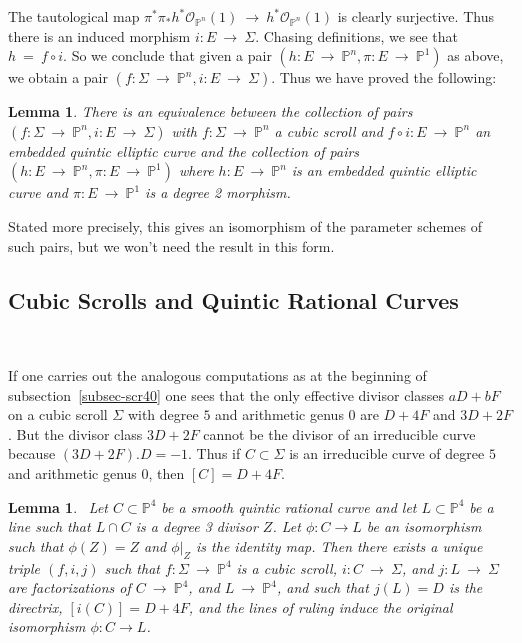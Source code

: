 \documentclass[twoside,12pt,reqno]{amsart}
\theoremstyle{plain}
\newtheorem{lem}[thm]{Lemma}
\theoremstyle{definition}
\newcommand{\PP}{\mathbb{P}}
\def\ps{\vspace{4pt}}
\newcommand{\OO}{\mathcal O}
\begin{document}
\ps

The tautological map $\pi^*\pi_* h^*\OO_{\PP^n}(1)~\rightarrow~
h^*\OO_{\PP^n}(1)$ is clearly surjective.  Thus there is an induced
morphism $i:E~\rightarrow~ \Sigma$.  Chasing definitions, we see that
$h~=~f\circ i$.  So we conclude that given a pair $(h:E~\rightarrow~
\PP^n, \pi:E~\rightarrow~ \PP^1)$ as above, we obtain a pair
$(f:\Sigma~\rightarrow~ \PP^n, i:E~\rightarrow~ \Sigma)$.  Thus we
have proved the following:

\begin{lem}\label{lem-equiv1}
There is an equivalence between the collection of pairs
$(f:\Sigma~\rightarrow~ \PP^n, i:E~\rightarrow~ \Sigma)$ with
$f:\Sigma~\rightarrow~ \PP^n$ a cubic scroll and $f\circ i:E~\rightarrow~
\PP^n$ an embedded quintic elliptic curve and the collection of pairs
$(h:E~\rightarrow~ \PP^n, \pi:E~\rightarrow~ \PP^1)$ where $h:E~\rightarrow~
\PP^n$ is an embedded quintic elliptic curve and $\pi:E~\rightarrow~
\PP^1$ is a degree 2 morphism.  
\end{lem}

Stated more precisely, this gives an
isomorphism of the parameter schemes of such pairs, but we won't need
the result in this form.

\ps

\subsection{Cubic Scrolls and Quintic Rational
Curves}~\label{subsec-scr50}

\ps

If one carries out the analogous computations as at the beginning of
subsection~\ref{subsec-scr40} one sees that the only effective divisor
classes $aD+bF$ on a cubic scroll $\Sigma$ with degree $5$ and
arithmetic genus $0$ are $D+4F$ and $3D+2F$.  But the divisor class
$3D+2F$ cannot be the divisor of an irreducible curve because
$(3D+2F).D = -1$.  Thus if $C\subset \Sigma$ is an irreducible curve
of degree $5$ and arithmetic genus $0$, then $[C]=D+4F$.  

\ps

\begin{lem}~\label{lem-scr50}
Let $C\subset \PP^4$ be a smooth quintic rational curve
and let $L\subset \PP^4$ be a line such that $L\cap C$ is a degree 3
divisor $Z$.  Let $\phi:C\rightarrow L$ be an isomorphism such that
$\phi(Z)=Z$ and $\phi|_Z$ is the identity map.  Then there exists a
unique triple $(f,i,j)$ such that $f:\Sigma~\rightarrow~\PP^4$ is a
cubic scroll, $i:C~\rightarrow~\Sigma$, and $j:L~\rightarrow~\Sigma$ 
are factorizations of $C~\rightarrow~\PP^4$, and $L~\rightarrow~\PP^4$,
and such that $j(L)=D$ is the
directrix, $[i(C)]=D+4F$, and the lines of ruling induce the original 
isomorphism $\phi:C\rightarrow L$.
\end{lem}
\end{document}
